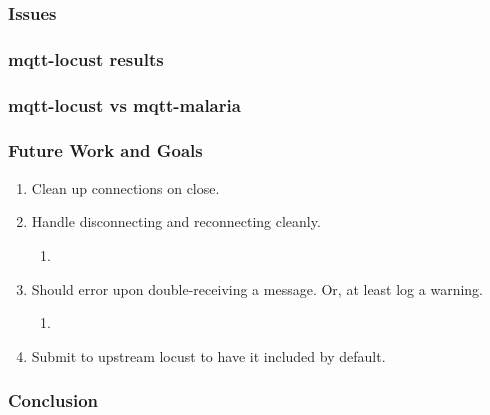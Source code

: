 \documentclass{beamer}
\begin{document}
\begin{frame}
    \frametitle{Issues}
\end{frame}

\begin{frame}
    \frametitle{mqtt-locust results}
\end{frame}

\begin{frame}
    \frametitle{mqtt-locust vs mqtt-malaria}
\end{frame}

\begin{frame}
    \frametitle{Future Work and Goals}
    \begin{enumerate}
        \item
            Clean up connections on close.
        \item
            Handle disconnecting and reconnecting cleanly.
            \begin{enumerate}
                \item
            \end{enumerate}
        \item
            Should error upon double-receiving a message. Or, at least log a
            warning.
            \begin{enumerate}
                \item
            \end{enumerate}
        \item
            Submit to upstream locust to have it included by default.
    \end{enumerate}
\end{frame}

\begin{frame}
    \frametitle{Conclusion}
\end{frame}
\end{document}
